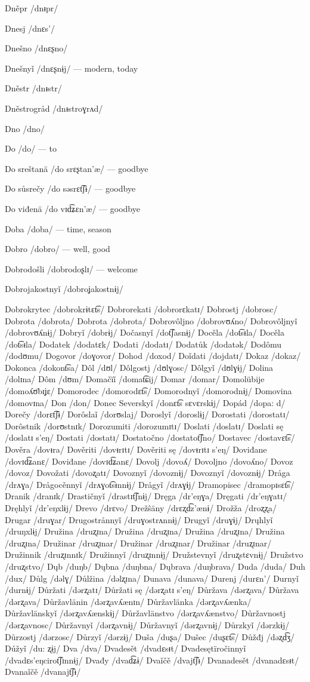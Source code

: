 Dněpr /dnᵻpr/

Dnesj /dnɛs’/

Dnešno /dnɛʂno/

Dnešnyǐ /dnɛʂnɨj/ — modern, today

Dněstr /dnᵻstr/

Dněstrogråd /dnᵻstroɣrʌd/

Dno /dno/

Do /do/ — to

Do sreštanä /do srɛʂtan’æ/ — goodbye

Do sůsrečy /do səsrɛt͡ʃɨ/ — goodbye

Do viđenä /do vɪd͡ʑɛn’æ/ — goodbye

Doba /doba/ — time, season

Dobro /dobro/ — well, good

Dobrodošli /dobrodoʂlɪ/ — welcome

Dobrojakostnyǐ /dobroʝakostnɨj/

Dobrokrytec /dobrokrɨtɛt͡s/
Dobrorekati /dobrorɛkatɪ/
Dobrostj /dobrosc/
Dobrota /dobrota/
Dobrota /dobrota/
Dobrovôljno /dobrovʊʎno/
Dobrovôljnyǐ /dobrovʊʎnɨj/
Dobryǐ /dobrɨj/
Dočasnyǐ /dot͡ʃasnɨj/
Docěla /dot͡sᵻla/
Docěla /dot͡sᵻla/
Dodatek /dodatɛk/
Dodati /dodatɪ/
Dodatůk /dodatək/
Dodômu /dodʊmu/
Dogovor /doɣovor/
Dohod /doxod/
Doǐdati /dojdatɪ/
Dokaz /dokaz/
Dokonca /dokont͡sa/
Dôl /dʊl/
Dôlgostj /dʊlɣosc/
Dôlgyǐ /dʊlɣɨj/
Dolina /dolɪna/
Dôm /dʊm/
Domačïǐ /domat͡ɕij/
Domar /domar/
Domolübije /domoʎʊ̈bɪʝɛ/
Domorodec /domorodɛt͡s/
Domorodnyǐ /domorodnɨj/
Domovina /domovɪna/
Don /don/
Donec Severskyǐ /donɛt͡s sɛvɛrskɨj/
Dopád /dopa: d/
Dorečy /dorɛt͡ʃɨ/
Dorôslaǐ /dorʊslaj/
Doroslyǐ /doroslɨj/
Dorostati /dorostatɪ/
Dorôstnik /dorʊstnɪk/
Dorozumiti /dorozumɪtɪ/
Doslati /doslatɪ/
Doslati sę /doslatɪ s’eŋ/
Dostati /dostatɪ/
Dostatočno /dostatot͡ʃno/
Dostavec /dostavɛt͡s/
Dověra /dovᵻra/
Dověriti /dovᵻrɪtɪ/
Dověriti sę /dovᵻrɪtɪ s’eŋ/
Doviđane /dovɪd͡ʑanɛ/
Doviđane /dovɪd͡ʑanɛ/
Dovolj /dovoʎ/
Dovoljno /dovoʎno/
Dovoz /dovoz/
Dovožati /dovoʐatɪ/
Dovoznyǐ /dovoznɨj/
Dovoznyǐ /dovoznɨj/
Dråga /drʌɣa/
Drågocěnnyǐ /drʌɣot͡sᵻnnɨj/
Drågyǐ /drʌɣɨj/
Dramopisec /dramopɪsɛt͡s/
Dranik /dranɪk/
Drastičnyǐ /drastɪt͡ʃnɨj/
Dręga /dr’eŋɣa/
Dręgati /dr’eŋɣatɪ/
Dręhlyǐ /dr’eŋxlɨj/
Drevo /drɛvo/
Drežŝäny /drɛʐd͡z’ænɨ/
Drožža /droʐʐa/
Drugar /druɣar/
Drugostrånnyǐ /druɣostrʌnnɨj/
Drugyǐ /druɣɨj/
Drųhlyǐ /druŋxlɨj/
Družina /druʐɪna/
Družina /druʐɪna/
Družina /druʐɪna/
Družina /druʐɪna/
Družinar /druʐɪnar/
Družinar /druʐɪnar/
Družinar /druʐɪnar/
Družinnik /druʐɪnnɪk/
Družinnyǐ /druʐɪnnɨj/
Družstevnyǐ /druʐstɛvnɨj/
Družstvo /druʐstvo/
Dųb /duŋb/
Dųbna /duŋbna/
Dųbrava /duŋbrava/
Duda /duda/
Duh /dux/
Důlg /dəlɣ/
Důlžina /dəlʐɪna/
Dunava /dunava/
Durenj /durɛn’/
Durnyǐ /durnɨj/
Důržati /dərʐatɪ/
Důržati sę /dərʐatɪ s’eŋ/
Důržava /dərʐava/
Důržava /dərʐava/
Důržavlänin /dərʐavʎænɪn/
Důržavlänka /dərʐavʎænka/
Důržavlänskyǐ /dərʐavʎænskɨj/
Důržavlänstvo /dərʐavʎænstvo/
Důržavnostj /dərʐavnosc/
Důržavnyǐ /dərʐavnɨj/
Důržavnyǐ /dərʐavnɨj/
Důrzkyǐ /dərzkɨj/
Důrzostj /dərzosc/
Důrzyǐ /dərzɨj/
Duša /duʂa/
Dušec /duʂɛt͡s/
Důžđj /dəʐd͡ʒ/
Dúžyǐ /du: ʐɨj/
Dva /dva/
Dvadesět /dvadɛsᵻt/
Dvadesętïročinnyǐ /dvadɛs’eŋcirot͡ʃɪnnɨj/
Dvađy /dvad͡ʑɨ/
Dvaǐčě /dvajt͡ʃᵻ/
Dvanadesět /dvanadɛsᵻt/
Dvanaǐčě /dvanajt͡ʃᵻ/

